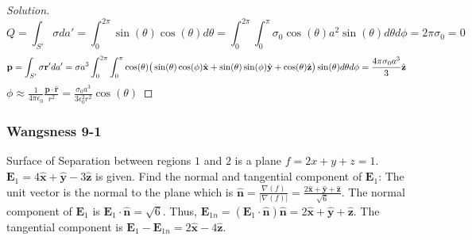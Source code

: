 \documentclass[crop=false,class=article,oneside]{standalone}
\begin{document}
        \begin{problem}[Wangsness 8-8]
        \end{problem}
        \begin{proof}[Solution]
        \begin{equation*}
            Q = \int_{S'} \sigma da'= \int_{0}^{2\pi} \sin(\theta)\cos(\theta)d\theta = \int_{0}^{2\pi} \int_{0}^{\pi} \sigma_{0} \cos(\theta) a^2 \sin(\theta) d\theta d\phi = 2\pi \sigma_{0} = 0
        \end{equation*}
        \begin{equation*}
            \mathbf{p}=\int_{S'}\sigma \mathbf{r}' da'\\
            =\sigma a^{3}\int_{0}^{2\pi} \int_{0}^{\pi} \cos(\theta) \big(\sin(\theta) \cos(\phi) \hat{\mathbf{x}} + \sin(\theta)\sin(\phi) \hat{\mathbf{y}} + \cos(\theta) \hat{\mathbf{z}}\big)\sin(\theta)d\theta d\phi\\
            =\frac{4\pi \sigma_0 a^3}{3} \hat{\mathbf{z}}
        \end{equation*}
        $\phi \approx \frac{1}{4\pi \epsilon_0} \frac{\mathbf{p}\cdot \hat{\mathbf{r}}}{r^2} = \frac{\sigma_0 a^3}{3\epsilon_0^2 r^2}\cos(\theta)$
        \end{proof}
        \subsubsection{Wangsness 9-1}
        Surface of Separation between regions $1$ and $2$ is a plane $f=2x+y+z=1$. $\mathbf{E}_1 = 4\hat{\mathbf{x}}+\hat{\mathbf{y}}-3\hat{\mathbf{z}}$ is given. Find the normal and tangential component of $\mathbf{E}_1$: The unit vector is the normal to the plane which is $\hat{\mathbf{n}}=\frac{\nabla(f)}{|\nabla(f)|} = \frac{2\hat{\mathbf{x}}+\hat{\mathbf{y}}+\hat{\mathbf{z}}}{\sqrt{6}}$. The normal component of $\mathbf{E}_1$ is $\mathbf{E}_1 \cdot \hat{\mathbf{n}} = \sqrt{6}$. Thus, $\mathbf{E}_{1n} = (\mathbf{E}_1 \cdot \hat{\mathbf{n}})\hat{\mathbf{n}} = 2\hat{\mathbf{x}}+\hat{\mathbf{y}}+\hat{\mathbf{z}}$. The tangential component is $\mathbf{E}_1 - \mathbf{E}_{1n} = 2\hat{\mathbf{x}}-4\hat{\mathbf{z}}$.
\end{document}
